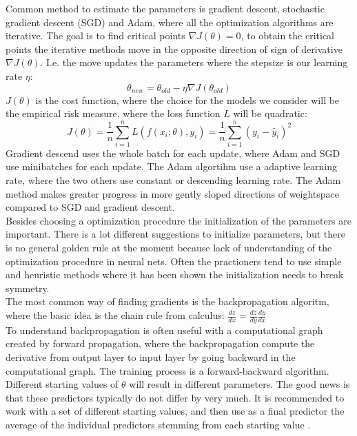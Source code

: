 Common method to estimate the parameters is gradient descent, stochastic gradient descent (SGD) and Adam, where all the optimization algorithms are iterative. The goal is to find critical points $\nabla J(\theta)=0$, to obtain the critical points the iterative methods move in the opposite direction of sign of derivative $\nabla J(\theta)$. I.e. the move updates the parameters where the stepsize is our learning rate $\eta$:
$$\theta_{new}=\theta_{old} - \eta \nabla J(\theta_{old}) $$
$J(\theta)$ is the cost function, where the choice for the models we consider will be the empirical risk measure, where the loss function $L$ will be quadratic:
$$J(\theta)= \frac{1}{n}\sum_{i=1}^{n} L(f(x_i;\theta),y_i)=\frac{1}{n}\sum_{i=1}^{n} (y_i-\hat{y}_i)^2$$
Gradient descend uses the whole batch for each update, where Adam and SGD use minibatches for each update. The Adam algortihm use a adaptive learning rate, where the two others use constant or descending learning rate. The Adam method makes greater progress in more gently sloped directions of weightspace compared to SGD and gradient descent.\\ 

Besides choosing a optimization procedure the initialization of the parameters are important. There is a lot different suggestions to initialize parameters, but there is no general golden rule at the moment because lack of understanding of the optimization procedure in neural nets. Often the practioners tend to use simple and heuristic methods where it has been shown the initialization needs to break symmetry.\\

The most common way of finding gradients is the backpropagation algoritm, where the basic idea is the chain rule from calculus: $\frac{dz}{dx}= \frac{dz}{dy} \frac{dy}{dx}$\\
To understand backpropagation is often useful with a computational graph created by forward propagation, where the backpropagation compute the derivative from output layer to input layer by going backward in the computational graph. The training process is a forward-backward algorithm. Different starting values of $\theta$ will result in different parameters. The good news is that these predictors typically do not differ by very much. It is recommended to work with a set of different starting values, and then use as a final predictor the average of the individual predictors stemming from each starting value \parencite{Goodfellow-et-al-2016}.



